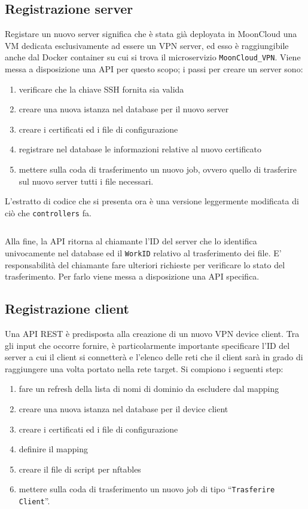 \subsection{Registrazione server}
Registare un nuovo server significa che è stata già deployata in MoonCloud una VM dedicata
esclusivamente ad essere un VPN server, ed esso è raggiungibile anche dal Docker container su
cui si trova il microservizio \texttt{MoonCloud\_VPN}.
Viene messa a disposizione una API per questo scopo; i passi per creare un server sono:
\begin{enumerate}
	\item verificare che la chiave SSH fornita sia valida
	\item creare una nuova istanza nel database per il nuovo server
	\item creare i certificati ed i file di configurazione
	\item registrare nel database le informazioni relative al nuovo certificato
	\item mettere sulla coda di trasferimento un nuovo job, ovvero quello di
	      trasferire sul nuovo server tutti i file necessari.
\end{enumerate}
L'estratto di codice che si presenta ora è una versione leggermente modificata di ciò che
\texttt{controllers} fa.
\inputminted[tabsize=4, breaklines, fontsize=\footnotesize]{python}{code_samples/controllers_create_server.py}

Alla fine, la API ritorna al chiamante l'ID del server che lo identifica univocamente
nel database ed il \texttt{WorkID} relativo al trasferimento dei file. E' responsabilità
del chiamante fare ulteriori richieste per verificare lo stato del trasferimento. Per farlo
viene messa a disposizione una API specifica.

\subsection{Registrazione client}
Una API REST è predisposta alla creazione di un nuovo VPN device client. Tra gli input
che occorre fornire, è particolarmente importante specificare l'ID del server a cui
il client si connetterà e l'elenco delle reti che il client sarà in grado di
raggiungere una volta portato nella rete target.
Si compiono i seguenti step:
\begin{enumerate}
	\item fare un refresh della lista di nomi di dominio da escludere dal mapping
	\item creare una nuova istanza nel database per il device client
	\item creare i certificati ed i file di configurazione
	\item definire il mapping
	\item creare il file di script per nftables
	\item mettere sulla coda di trasferimento un nuovo job di tipo ``\texttt{Trasferire Client}''.
\end{enumerate}

